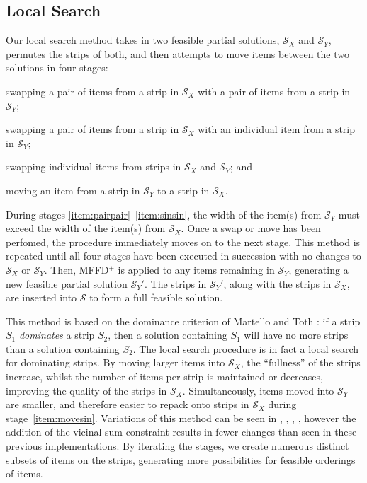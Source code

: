 \documentclass{elsarticle}
\begin{document}
\subsection{Local Search}
\label{sub:localsearch}
Our local search method takes in two feasible partial solutions, $\mathcal{S}_X$ and $\mathcal{S}_Y$, permutes the strips of both, and then attempts to move items between the two solutions in four stages: 
\begin{enumerate*}[label={(\roman*)}]
	\item swapping a pair of items from a strip in $\mathcal{S}_X$ with a pair of items from a strip in $\mathcal{S}_Y$;\label{item:pairpair}
	\item swapping a pair of items from a strip in $\mathcal{S}_X$ with an individual item from a strip in $\mathcal{S}_Y$;\label{item:pairsin}
	\item swapping individual items from strips in $\mathcal{S}_X$ and $\mathcal{S}_Y$;\label{item:sinsin} and
	\item moving an item from a strip in $\mathcal{S}_Y$ to a strip in $\mathcal{S}_X$.\label{item:movesin}
\end{enumerate*} 
During stages \ref{item:pairpair}--\ref{item:sinsin}, the width of the item(s) from $\mathcal{S}_Y$ must exceed the width of the item(s) from $\mathcal{S}_X$. Once a swap or move has been perfomed, the procedure immediately moves on to the next stage. This method is repeated until all four stages have been executed in succession with no changes to $\mathcal{S}_X$ or $\mathcal{S}_Y$. Then, MFFD$^+$ is applied to any items remaining in $\mathcal{S}_Y$, generating a new feasible partial solution $\mathcal{S}_Y'$. The strips in $\mathcal{S}_Y'$, along with the strips in $\mathcal{S}_X$, are inserted into $\mathcal{S}$ to form a full feasible solution.

This method is based on the dominance criterion of Martello and Toth \cite{martello1990l}: if a strip $S_1$ \emph{dominates} a strip $S_2$, then a solution containing $S_1$ will have no more strips than a solution containing $S_2$. The local search procedure is in fact a local search for dominating strips. By moving larger items into $\mathcal{S}_X$, the ``fullness'' of the strips increase, whilst the number of items per strip is maintained or decreases, improving the quality of the strips in $\mathcal{S}_X$. Simultaneously, items moved into $\mathcal{S}_Y$ are smaller, and therefore easier to repack onto strips in $\mathcal{S}_X$ during stage~\ref{item:movesin}. Variations of this method can be seen in \cite{falkenauer1996}, \cite{levine2004}, \cite{lewis2009}, \cite{lewis2017}, however the addition of the vicinal sum constraint results in fewer changes than seen in these previous implementations. By iterating the stages, we create numerous distinct subsets of items on the strips, generating more possibilities for feasible orderings of items.
\end{document}

